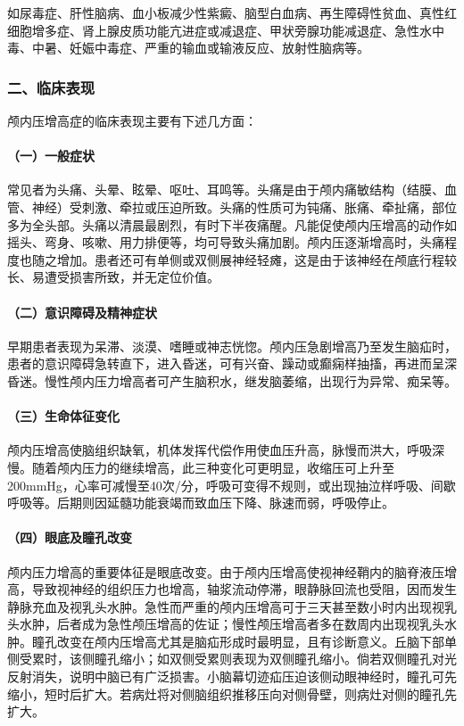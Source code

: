 如尿毒症、肝性脑病、血小板减少性紫癜、脑型白血病、再生障碍性贫血、真性红细胞增多症、肾上腺皮质功能亢进症或减退症、甲状旁腺功能减退症、急性水中毒、中暑、妊娠中毒症、严重的输血或输液反应、放射性脑病等。

\subsubsection{二、临床表现}

颅内压增高症的临床表现主要有下述几方面：

\paragraph{（一）一般症状}

常见者为头痛、头晕、眩晕、呕吐、耳鸣等。头痛是由于颅内痛敏结构（结膜、血管、神经）受刺激、牵拉或压迫所致。头痛的性质可为钝痛、胀痛、牵扯痛，部位多为全头部。头痛以清晨最剧烈，有时下半夜痛醒。凡能促使颅内压增高的动作如摇头、弯身、咳嗽、用力排便等，均可导致头痛加剧。颅内压逐渐增高时，头痛程度也随之增加。患者还可有单侧或双侧展神经轻瘫，这是由于该神经在颅底行程较长、易遭受损害所致，并无定位价值。

\paragraph{（二）意识障碍及精神症状}

早期患者表现为呆滞、淡漠、嗜睡或神志恍惚。颅内压急剧增高乃至发生脑疝时，患者的意识障碍急转直下，进入昏迷，可有兴奋、躁动或癫痫样抽搐，再进而呈深昏迷。慢性颅内压力增高者可产生脑积水，继发脑萎缩，出现行为异常、痴呆等。

\paragraph{（三）生命体征变化}

颅内压增高使脑组织缺氧，机体发挥代偿作用使血压升高，脉慢而洪大，呼吸深慢。随着颅内压力的继续增高，此三种变化可更明显，收缩压可上升至200mmHg，心率可减慢至40次/分，呼吸可变得不规则，或出现抽泣样呼吸、间歇呼吸等。后期则因延髓功能衰竭而致血压下降、脉速而弱，呼吸停止。

\paragraph{（四）眼底及瞳孔改变}

颅内压力增高的重要体征是眼底改变。由于颅内压增高使视神经鞘内的脑脊液压增高，导致视神经的组织压力也增高，轴浆流动停滞，眼静脉回流也受阻，因而发生静脉充血及视乳头水肿。急性而严重的颅内压增高可于三天甚至数小时内出现视乳头水肿，后者成为急性颅压增高的佐证；慢性颅压增高者多在数周内出现视乳头水肿。瞳孔改变在颅内压增高尤其是脑疝形成时最明显，且有诊断意义。丘脑下部单侧受累时，该侧瞳孔缩小；如双侧受累则表现为双侧瞳孔缩小。倘若双侧瞳孔对光反射消失，说明中脑已有广泛损害。小脑幕切迹疝压迫该侧动眼神经时，瞳孔可先缩小，短时后扩大。若病灶将对侧脑组织推移压向对侧骨壁，则病灶对侧的瞳孔先扩大。

